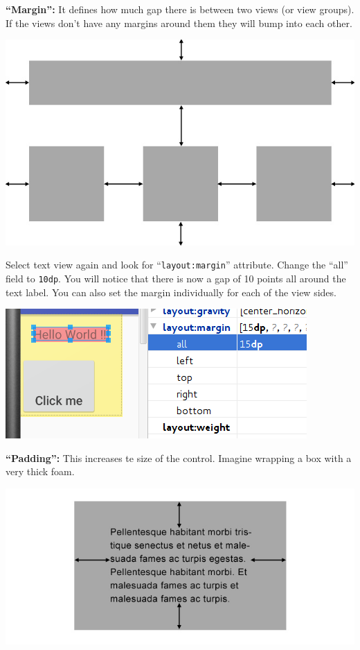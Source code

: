 \textbf{``Margin'':} It defines how much gap there is between two views (or view groups). If the views don't have any margins around them they will bump into each other. 

\begin{center}
	\includegraphics[scale=0.2]{chapters/ch03/images/13_margin_def}
\end{center} 

Select text view again and look for ``\texttt{layout:margin}'' attribute. Change the ``all'' field to \texttt{10dp}. You will notice that there is now a gap of 10 points all around the text label. You can also set the margin individually for each of the view sides. 

\begin{center}
	\includegraphics[scale=0.4]{chapters/ch03/images/14_margin}
\end{center} 

\textbf{``Padding'':} This increases te size of the control. Imagine wrapping a box with a very thick foam. 

\begin{center}
	\includegraphics[scale=0.2]{chapters/ch03/images/15_padding_def}
\end{center}

